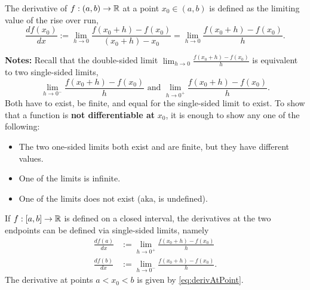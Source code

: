 \begin{tcolorbox}[colback=mylightblue, title = {\bf Derivative at a Point}, breakable]

\begin{definition}
\label{def:derivAtPoint}
The derivative of $f:(a, b) \to \mathbb R$ at a point $x_0 \in (a, b)$ is defined as the limiting value of the rise over run, 
 \begin{equation}
\label{eq:derivAtPoint}
    \frac{ df(x_0) }{d x}:= \lim_{h \to 0} \frac{f(x_0 + h) - f(x_0)}{(x_0+h) - x_0} =  \lim_{h \to 0} \frac{f(x_0 + h) - f(x_0)}{h}.
\end{equation}

\bigskip

\textbf{Notes:} Recall that the double-sided limit $\displaystyle \lim_{h \to 0} \frac{f(x_0 + h) - f(x_0)}{h}$ is equivalent to two single-sided limits,
$$\lim_{h \to 0^-} \frac{f(x_0 + h) - f(x_0)}{h} \text{ and } \lim_{h \to 0^+} \frac{f(x_0 + h) - f(x_0)}{h}.$$
Both have to exist, be finite, and equal for the single-sided limit to exist. To show that a function is \textbf{not differentiable at} $x_0$, it is enough to show any one of the following:
\begin{itemize}
    \item The two one-sided limits both exist and are finite, but they have different values.
    \item One of the limits is infinite.
    \item One of the limits does not exist (aka, is undefined).
\end{itemize}

\vspace{.1cm}

If $f:[a, b] \to \mathbb R$ is defined on a closed interval, the derivatives at the two endpoints can be defined via single-sided limits, namely
\label{def:derivAtEndPoints}
 \begin{equation}
\label{eq:derivAtBoundaryPoints}
\begin{aligned}
     \frac{ df(a) }{d x} & := \lim_{h \to 0^+} \frac{f(x_0 + h) - f(x_0)}{h} \\
     \frac{ df(b) }{d x} & := \lim_{h \to 0^-} \frac{f(x_0 + h) - f(x_0)}{h}.
\end{aligned}   
\end{equation}
The derivative at points $a < x_0 < b$ is given by \eqref{eq:derivAtPoint}.
\end{definition}
\end{tcolorbox}

